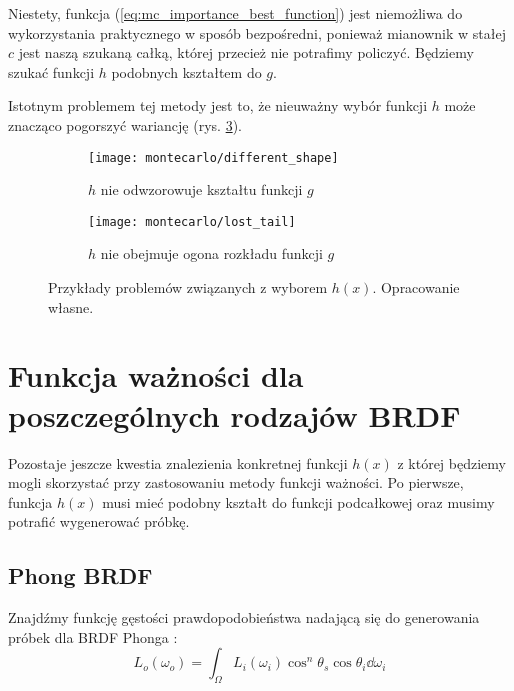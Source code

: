 \documentclass[../main.tex]{subfiles}
\begin{document}
\noindent Niestety, funkcja (\ref{eq:mc_importance_best_function}) jest niemożliwa do wykorzystania praktycznego w sposób bezpośredni, ponieważ mianownik w stałej $c$ jest naszą szukaną całką, której przecież nie potrafimy policzyć. Będziemy szukać funkcji $h$ podobnych kształtem do $g$.

Istotnym problemem tej metody jest to, że nieuważny wybór funkcji $h$ może znacząco pogorszyć wariancję (rys. \ref{fig:ImportanceSamplingProblems}).

\begin{figure}
  \centering

  \begin{subfigure}[t]{0.45\textwidth}
    \texttt{[image: montecarlo/different\_shape]}
    \label{fig:ImportanceSamplingWrongFunction}
    \caption{$h$ nie odwzorowuje kształtu funkcji $g$}
  \end{subfigure}
  \begin{subfigure}[t]{0.45\textwidth}
    \centering
    \texttt{[image: montecarlo/lost\_tail]}
    \label{fig:ImportanceSamplingLostTail}
    \caption{$h$ nie obejmuje ogona rozkładu funkcji $g$}
  \end{subfigure}

  \caption{Przykłady problemów związanych z wyborem $h(x)$. Opracowanie własne.}
  \label{fig:ImportanceSamplingProblems}
\end{figure}

\section{Funkcja ważności dla poszczególnych rodzajów BRDF}

Pozostaje jeszcze kwestia znalezienia konkretnej funkcji $h(x)$ z której będziemy mogli skorzystać przy zastosowaniu metody funkcji ważności. Po pierwsze, funkcja $h(x)$ musi mieć podobny kształt do funkcji podcałkowej oraz musimy potrafić wygenerować próbkę.

\subsection{Phong BRDF}

Znajdźmy funkcję gęstości prawdopodobieństwa nadającą się do generowania próbek dla BRDF Phonga \cite{NotesImportanceSampling,ImportanceSamplingForProduction}:
\begin{equation}
  L_o(\omega_o) = \int_{\Omega} {
    L_i(\omega_i) \cos^{n}\theta_s \cos\theta_i \dd \omega_i
  }
\end{equation}
\end{document}
